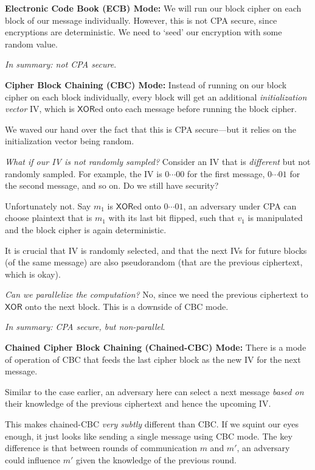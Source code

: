 \textbf{Electronic Code Book (ECB) Mode:} We will run our block cipher on each block of our message individually. However, this is not CPA secure, since encryptions are deterministic. We need to `seed' our encryption with some random value. 

\emph{In summary: not CPA secure}.

\textbf{Cipher Block Chaining (CBC) Mode:} Instead of running on our block cipher on each block individually, every block will get an additional \emph{initialization vector} IV, which is $\mathsf{XOR}$ed onto each message before running the block cipher.


We waved our hand over the fact that this is CPA secure---but it relies on the initialization vector being random.

\emph{What if our IV is not randomly sampled?} Consider an IV that is \emph{different} but not randomly sampled. For example, the IV is $0\cdots 00$ for the first message, $0\cdots 01$ for the second message, and so on. Do we still have security?

Unfortunately not. Say $m_1$ is $\mathsf{XOR}$ed onto $0\cdots 01$, an adversary under CPA can choose plaintext that is $m_1$ with its last bit flipped, such that $v_1$ is manipulated and the block cipher is again deterministic.

It is crucial that IV is randomly selected, and that the next IVs for future blocks (of the same message) are also pseudorandom (that are the previous ciphertext, which is okay).

\emph{Can we parallelize the computation?} No, since we need the previous ciphertext to $\mathsf{XOR}$ onto the next block. This is a downside of CBC mode.

\emph{In summary: CPA secure, but non-parallel}.

\textbf{Chained Cipher Block Chaining (Chained-CBC) Mode:} There is a mode of operation of CBC that feeds the last cipher block as the new IV for the next message.


Similar to the case earlier, an adversary here can select a next message \emph{based on} their knowledge of the previous ciphertext and hence the upcoming IV.

This makes chained-CBC \emph{very subtly} different than CBC. If we squint our eyes enough, it just looks like sending a single message using CBC mode. The key difference is that between rounds of communication $m$ and $m'$, an adversary could influence $m'$ given the knowledge of the previous round.

